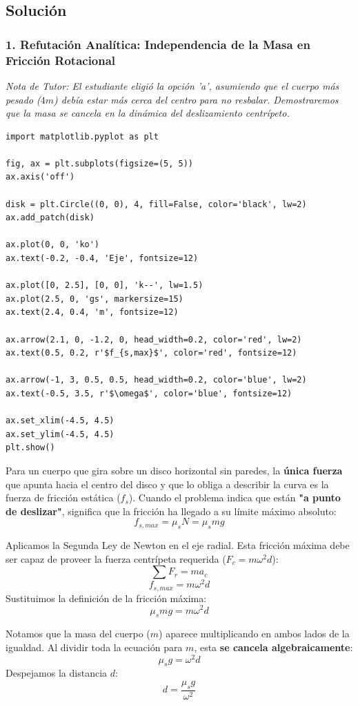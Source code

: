 \documentclass[12pt, a4paper]{article}
\begin{document}
\subsection*{Solución}

\subsubsection*{1. Refutación Analítica: Independencia de la Masa en Fricción Rotacional}
\textit{Nota de Tutor: El estudiante eligió la opción 'a', asumiendo que el cuerpo más pesado ($4m$) debía estar más cerca del centro para no resbalar. Demostraremos que la masa se cancela en la dinámica del deslizamiento centrípeto.}

\begin{verbatim}
import matplotlib.pyplot as plt

fig, ax = plt.subplots(figsize=(5, 5))
ax.axis('off')

disk = plt.Circle((0, 0), 4, fill=False, color='black', lw=2)
ax.add_patch(disk)

ax.plot(0, 0, 'ko')
ax.text(-0.2, -0.4, 'Eje', fontsize=12)

ax.plot([0, 2.5], [0, 0], 'k--', lw=1.5)
ax.plot(2.5, 0, 'gs', markersize=15)
ax.text(2.4, 0.4, 'm', fontsize=12)

ax.arrow(2.1, 0, -1.2, 0, head_width=0.2, color='red', lw=2)
ax.text(0.5, 0.2, r'$f_{s,max}$', color='red', fontsize=12)

ax.arrow(-1, 3, 0.5, 0.5, head_width=0.2, color='blue', lw=2)
ax.text(-0.5, 3.5, r'$\omega$', color='blue', fontsize=12)

ax.set_xlim(-4.5, 4.5)
ax.set_ylim(-4.5, 4.5)
plt.show()
\end{verbatim}

Para un cuerpo que gira sobre un disco horizontal sin paredes, la \textbf{única fuerza} que apunta hacia el centro del disco y que lo obliga a describir la curva es la fuerza de fricción estática ($f_s$).
Cuando el problema indica que están \textbf{"a punto de deslizar"}, significa que la fricción ha llegado a su límite máximo absoluto: 
$$ f_{s,max} = \mu_s N = \mu_s mg $$

Aplicamos la Segunda Ley de Newton en el eje radial. Esta fricción máxima debe ser capaz de proveer la fuerza centrípeta requerida ($F_c = m \omega^2 d$):
$$ \sum F_r = m a_c $$
$$ f_{s,max} = m \omega^2 d $$
Sustituimos la definición de la fricción máxima:
$$ \mu_s mg = m \omega^2 d $$

Notamos que la masa del cuerpo ($m$) aparece multiplicando en ambos lados de la igualdad. Al dividir toda la ecuación para $m$, esta \textbf{se cancela algebraicamente}:
$$ \mu_s g = \omega^2 d $$
Despejamos la distancia $d$:
$$ d = \frac{\mu_s g}{\omega^2} $$
\end{document}
